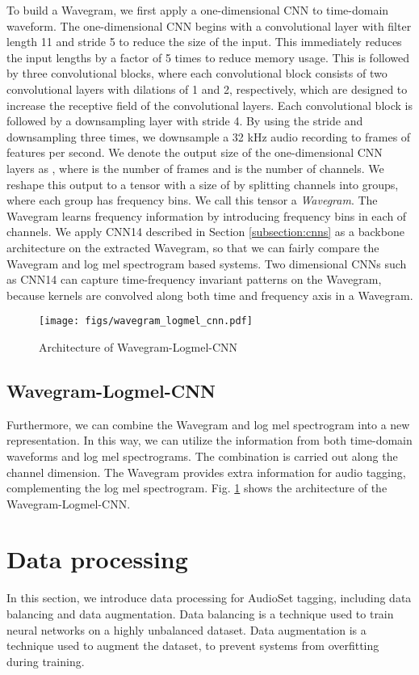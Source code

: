 \documentclass[journal]{IEEEtran}
\newcommand{\qk}[1] {{\color{black} #1}}
\begin{document}
To build a Wavegram, we first apply a one-dimensional CNN to time-domain waveform. The one-dimensional CNN begins with a convolutional layer with filter length 11 and stride 5 to reduce the size of the input. This immediately reduces the input lengths by a factor of 5 times to reduce memory usage. This is followed by three convolutional blocks, where each convolutional block consists of two convolutional layers with dilations of 1 and 2, respectively, which are designed to increase the receptive field of the convolutional layers. Each convolutional block is followed by a downsampling layer with stride 4. By using the stride and downsampling three times, we downsample a 32 kHz audio recording to  frames of features per second. We denote the output size of the one-dimensional CNN layers as , where  is the number of frames and  is the number of channels. \qk{We reshape this output to a tensor with a size of  by splitting  channels into  groups, where each group has  frequency bins. We call this tensor a \textit{Wavegram}. The Wavegram learns frequency information by introducing  frequency bins in each of  channels.} \qk{We apply CNN14 described in Section \ref{subsection:cnns} as a backbone architecture on the extracted Wavegram, so that we can fairly compare the Wavegram and log mel spectrogram based systems. Two dimensional CNNs such as CNN14 can capture time-frequency invariant patterns on the Wavegram, because kernels are convolved along both time and frequency axis in a Wavegram.}

\begin{figure}[t]
  \centering
  \centerline{\texttt{[image: figs/wavegram\_logmel\_cnn.pdf]}}
  \caption{Architecture of Wavegram-Logmel-CNN}
  \label{fig:wavegram_logmel_cnn}
\end{figure}

\subsection{Wavegram-Logmel-CNN}
Furthermore, we can combine the Wavegram and log mel spectrogram into a new representation. In this way, we can utilize the information from both time-domain waveforms and log mel spectrograms. The combination is carried out along the channel dimension. The Wavegram provides extra information for audio tagging, complementing the log mel spectrogram. Fig. \ref{fig:wavegram_logmel_cnn} shows the architecture of the Wavegram-Logmel-CNN. 


\section{Data processing}\label{section:data_processing}
In this section, we introduce data processing for AudioSet tagging, including data balancing and data augmentation. Data balancing is a technique used to train neural networks on a highly unbalanced dataset. Data augmentation is a technique used to augment the dataset, to prevent systems from overfitting during training. 
\end{document}

